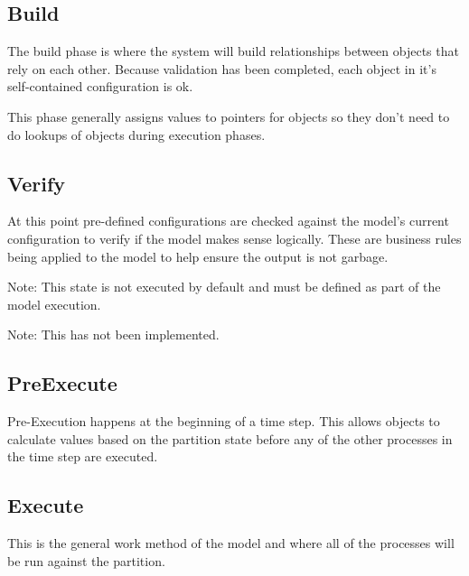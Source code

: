 \documentclass[a4paper,11pt,twoside,pdftex,draft]{article}
\begin{document}
\hypertarget{build}{%
\subsection[Build]{\texorpdfstring{\protect\hypertarget{anchor-20}{}{}Build}{Build}}\label{build}}

The build phase is where the system will build relationships between
objects that rely on each other. Because validation has been completed,
each object in it's self-contained configuration is ok.

This phase generally assigns values to pointers for objects so they
don't need to do lookups of objects during execution phases.

\hypertarget{verify}{%
\subsection[Verify]{\texorpdfstring{\protect\hypertarget{anchor-21}{}{}Verify}{Verify}}\label{verify}}

At this point pre-defined configurations are checked against the model's
current configuration to verify if the model makes sense logically.
These are business rules being applied to the model to help ensure the
output is not garbage.

Note: This state is not executed by default and must be defined as part
of the model execution.

Note: This has not been implemented.

\hypertarget{preexecute}{%
\subsection[PreExecute]{\texorpdfstring{\protect\hypertarget{anchor-22}{}{}PreExecute}{PreExecute}}\label{preexecute}}

Pre-Execution happens at the beginning of a time step. This allows
objects to calculate values based on the partition state before any of
the other processes in the time step are executed.

\hypertarget{execute}{%
\subsection[Execute]{\texorpdfstring{\protect\hypertarget{anchor-23}{}{}Execute}{Execute}}\label{execute}}

This is the general work method of the model and where all of the
processes will be run against the partition.
\end{document}
